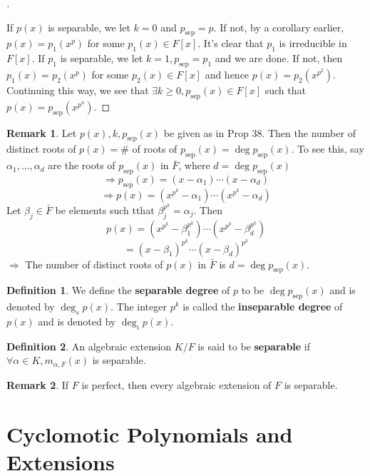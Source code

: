 \documentclass{article}
\theoremstyle{definition}
\newtheorem{dfn}{Definition}
\newtheorem{rem}{Remark}
\newenvironment{proofs}[1][\proofname]{%
  \begin{proof}[#1]$ $\par\nobreak\ignorespaces
}{%
  \end{proof}
}
\begin{document}
\begin{proofs}
	If $p(x)$ is separable, we let $k = 0$ and $p_{\text{sep}} = p$.
	If not, by a corollary earlier,  $p(x) = p_1(x^p)$ for some $p_1(x) \in F[x]$.
	It's clear that $p_1$ is irreducible in $F[x]$.
	If $p_1$ is separable, we let $k = 1, p_{\text{sep}} = p_1$ and we are done.
	If not, then $p_1(x) = p_2(x^p)$ for some $p_2(x) \in F[x]$ and hence $p(x) = p_2(x^{p^2})$.
	Continuing this way, we see that $\exists k \geq 0, p_{\text{sep}}(x) \in F[x]$ such that $p(x) = p_{\text{sep}}(x^{p^n})$. 
\end{proofs} 

\begin{rem}
	Let $p(x), k, p_{\text{sep}}(x)$ be given as in Prop 38.
	Then the number of distinct roots of $p(x) = \#$ of roots of $p_{\text{sep}}(x) = \deg p_{\text{sep}}(x)$.
	To see this, say $\alpha_1, ..., \alpha_d$ are the roots of $p_{\text{sep}}(x)$ in $\bar{F}$, where $d = \deg p_{\text{sep}}(x)$ 
	\[
		\Rightarrow p_{\text{sep}}(x) = (x - \alpha_1) \cdots (x - \alpha_d)
	\]
	\[
		\Rightarrow p(x) = (x^{p^k} - \alpha_1) \cdots (x^{p^k} - \alpha_d)
	\]
	Let $\beta_j \in \bar{F}$ be elements such tthat $\beta_j^{p^k} = \alpha_j$.
	Then 
	\[
		p(x) = (x^{p^k} - \beta_1^{p^k}) \cdots (x^{p^k} - \beta_d^{p^k})
	\]
	\[
		= (x - \beta_1)^{p^k} \cdots (x - \beta_d)^{p^k}
	\]
	$\Rightarrow$ The number of distinct roots of $p(x)$ in $\bar{F}$ is $d = \deg p_{\text{sep}}(x)$.
\end{rem}

\begin{dfn}
	We define the \textbf{separable degree} of $p$ to be $\deg p_{\text{sep}}(x)$ and is denoted by $\deg_s p(x)$. 
	The integer $p^k$ is called the \textbf{inseparable degree} of $p(x)$ and is denoted by $\deg_i p(x)$.
\end{dfn}

\begin{dfn}
	An algebraic extension $K/F$ is said to be \textbf{separable} if $\forall \alpha \in K, m_{\alpha, F}(x)$ is separable.
\end{dfn}

\begin{rem}
	If $F$ is perfect, then every algebraic extension of $F$ is separable.
\end{rem}

\section{Cyclomotic Polynomials and Extensions}
\end{document}
